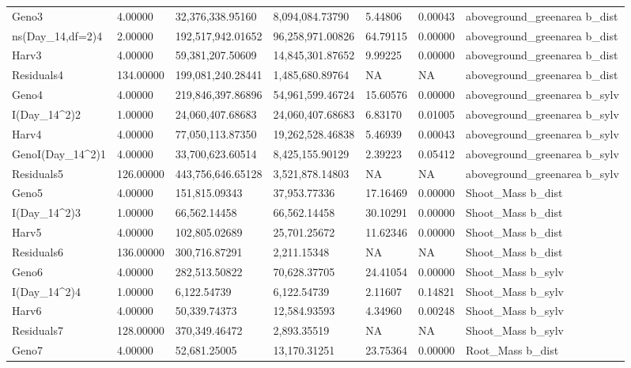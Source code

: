 \documentclass[jou,floatsintext]{apa6}
\begin{document}
\begin{table}[tbp]
\begin{center}
\begin{threeparttable}
{\begin{tabular}{lllllll}
Geno3 & 4.00000 & 32,376,338.95160 & 8,094,084.73790 & 5.44806 & 0.00043 & aboveground\_greenarea b\_dist\\
ns(Day\_14,df=2)4 & 2.00000 & 192,517,942.01652 & 96,258,971.00826 & 64.79115 & 0.00000 & aboveground\_greenarea b\_dist\\
Harv3 & 4.00000 & 59,381,207.50609 & 14,845,301.87652 & 9.99225 & 0.00000 & aboveground\_greenarea b\_dist\\
Residuals4 & 134.00000 & 199,081,240.28441 & 1,485,680.89764 & NA & NA & aboveground\_greenarea b\_dist\\
Geno4 & 4.00000 & 219,846,397.86896 & 54,961,599.46724 & 15.60576 & 0.00000 & aboveground\_greenarea b\_sylv\\
I(Day\_14\textasciicircum{}2)2 & 1.00000 & 24,060,407.68683 & 24,060,407.68683 & 6.83170 & 0.01005 & aboveground\_greenarea b\_sylv\\
Harv4 & 4.00000 & 77,050,113.87350 & 19,262,528.46838 & 5.46939 & 0.00043 & aboveground\_greenarea b\_sylv\\
GenoI(Day\_14\textasciicircum{}2)1 & 4.00000 & 33,700,623.60514 & 8,425,155.90129 & 2.39223 & 0.05412 & aboveground\_greenarea b\_sylv\\
Residuals5 & 126.00000 & 443,756,646.65128 & 3,521,878.14803 & NA & NA & aboveground\_greenarea b\_sylv\\
Geno5 & 4.00000 & 151,815.09343 & 37,953.77336 & 17.16469 & 0.00000 & Shoot\_Mass b\_dist\\
I(Day\_14\textasciicircum{}2)3 & 1.00000 & 66,562.14458 & 66,562.14458 & 30.10291 & 0.00000 & Shoot\_Mass b\_dist\\
Harv5 & 4.00000 & 102,805.02689 & 25,701.25672 & 11.62346 & 0.00000 & Shoot\_Mass b\_dist\\
Residuals6 & 136.00000 & 300,716.87291 & 2,211.15348 & NA & NA & Shoot\_Mass b\_dist\\
Geno6 & 4.00000 & 282,513.50822 & 70,628.37705 & 24.41054 & 0.00000 & Shoot\_Mass b\_sylv\\
I(Day\_14\textasciicircum{}2)4 & 1.00000 & 6,122.54739 & 6,122.54739 & 2.11607 & 0.14821 & Shoot\_Mass b\_sylv\\
Harv6 & 4.00000 & 50,339.74373 & 12,584.93593 & 4.34960 & 0.00248 & Shoot\_Mass b\_sylv\\
Residuals7 & 128.00000 & 370,349.46472 & 2,893.35519 & NA & NA & Shoot\_Mass b\_sylv\\
Geno7 & 4.00000 & 52,681.25005 & 13,170.31251 & 23.75364 & 0.00000 & Root\_Mass b\_dist\\

\end{tabular}}
\end{threeparttable}
\end{center}
\end{table}
\end{document}
